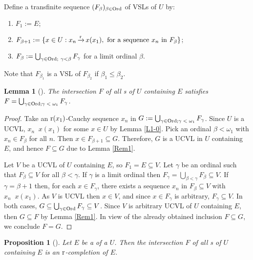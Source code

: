 \documentclass[12pt]{article}
\newtheorem{prop}{Proposition}
\newtheorem{lem}{Lemma}
\DeclareMathOperator{\ruc}{\xrightarrow[]{r}}
\renewcommand{\le}{\leqslant}
\begin{document}
Define a transfinite sequence $(F_\beta)_{\beta\in{\text{\rm Ord}}}$ of VSLs of $U$ by:
\begin{enumerate}[-]
\item 
$F_1:=E$;
\item
$F_{\beta+1}:=\{x\in U: x_n \ruc x(x_1),\ 
\text{\rm for a sequence}\ x_n\ \text{\rm in}\ F_{\beta}\}$;
\item
$F_\beta:=\bigcup_{\gamma\in{\text{\rm Ord}};\ \gamma<\beta}F_{\gamma}$
for a limit ordinal $\beta$.
\end{enumerate}

Note that $F_{\beta_1}$ is a VSL of $F_{\beta_2}$ if $\beta_1\le\beta_2$.

\begin{lem}[]\label{L1}
The intersection $F$ of all s of $U$ containing $E$ satisfies
$F=\bigcup_{\gamma\in{\text{\rm Ord;$\gamma<\omega_1$}}}F_{\gamma}$.
\end{lem}

\begin{proof}
Take an $\text{\rm r}(x_1)$-Cauchy sequence $x_n$ in 
$G:=\bigcup_{\gamma\in{\text{\rm Ord;$\gamma<\omega_1$}}}F_{\gamma}$. 
Since $U$ is a UCVL, $x_n\ruc x(x_1)$ for some $x\in U$ by Lemma \ref{L1-0}. 
Pick an ordinal $\beta<\omega_1$ with $x_n\in F_\beta$ for all $n$.
Then $x\in F_{\beta+1}\subseteq G$. 
Therefore, $G$ is a UCVL in $U$ containing $E$, and hence $F\subseteq G$ due to
Lemma \ref{Rem1}.

\smallskip
Let $V$ be a UCVL of $U$ containing $E$, so $F_1=E\subseteq V$. 
Let $\gamma$ be an ordinal such that $F_{\beta}\subseteq V$ for all $\beta<\gamma$.
If $\gamma$ is a limit ordinal then
$F_\gamma=\bigcup_{\beta<\gamma}F_{\beta}\subseteq V$.
If $\gamma=\beta+1$ then, for each $x\in F_\gamma$,
there exists a sequence $x_n$ in $F_\beta\subseteq V$
with $x_n \ruc x(x_1)$. As $V$ is UCVL then $x\in V$,
and since $x\in F_\gamma$ is arbitrary, $F_\gamma\subseteq V$.
In both cases, $G\subseteq\bigcup_{\gamma\in{\text{\rm Ord}}}F_{\gamma}\subseteq V$.
Since $V$ is arbitrary UCVL of $U$ containing $E$, then $G\subseteq F$
by Lemma \ref{Rem1}. In view of the already obtained inclusion
$F\subseteq G$, we conclude $F=G$.
\end{proof}

\begin{prop}[]\label{L2}
Let $E$ be a  of a  $U$. 
Then the intersection $F$ of all \text{\rm UCVL}s of $U$ containing $E$
is an $\text{\rm r}$-completion of $E$.
\end{prop}
\end{document}
